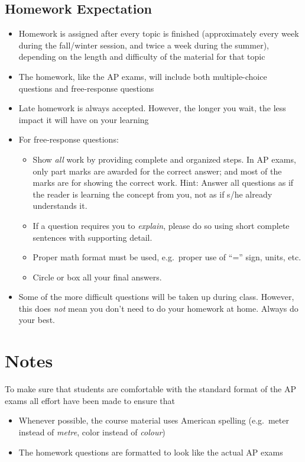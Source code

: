 \documentclass{../../oss-handout}
\begin{document}
\subsection{Homework Expectation}
\begin{itemize}[noitemsep,topsep=0pt,leftmargin=18pt]
\item Homework is assigned after every topic is finished (approximately every
  week during the fall/winter session, and twice a week during the summer),
  depending on the length and difficulty of the material for that topic
\item The homework, like the AP exams, will include both multiple-choice
  questions and free-response questions
\item Late homework is always accepted. However, the longer you wait, the less
  impact it will have on your learning
\item For free-response questions:
  \begin{itemize}[noitemsep,topsep=0pt,leftmargin=15pt]
  \item Show \emph{all} work by providing complete and organized steps.
    In AP exams, only part marks are awarded for the correct answer; and most of
    the marks are for showing the correct work. Hint: Answer all questions as
    if the reader is learning the concept from you, not as if s/he already
    understands it.
  \item If a question requires you to \emph{explain}, please do so using
    short complete sentences with supporting detail.
  \item Proper math format must be used, e.g.\ proper use of ``='' sign, units,
    etc.
  \item Circle or box all your final answers.
  \end{itemize}
\item Some of the more difficult questions will be taken up during class.
  However, this does \emph{not} mean you don't need to do your homework at
  home. Always do your best.
\end{itemize}


\section*{Notes}
To make sure that students are comfortable with the standard format of the AP
exams all effort have been made to ensure that
\begin{itemize}[noitemsep,topsep=0pt,leftmargin=15pt]
\item Whenever possible, the course material uses American spelling (e.g.\
  meter instead of \emph{metre}, color instead of \emph{colour})
\item The homework questions are formatted to look like the actual AP exams
\end{itemize}
\end{document}
